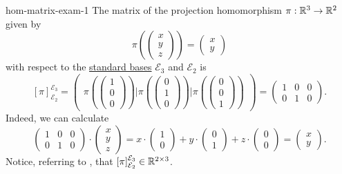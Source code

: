 \begin{example}{}{hom-matrix-exam-1}
 The matrix of the projection homomorphism $\pi:\mathbb{R}^3 \to \mathbb{R}^2$ given by
 \[
  \pi \left( 
  \begin{pmatrix}
   x\\
   y\\
   z
  \end{pmatrix}
  \right) = 
  \begin{pmatrix}
   x\\y
  \end{pmatrix}
 \]
 with respect to the \hyperref[def:standard-basis]{standard bases}
 $\mathcal{E}_3$ and $\mathcal{E}_2$ is
 \[
  [\pi]_{\mathcal{E}_2}^{\mathcal{E}_3} = 
  \begin{pmatrix}
   \pi \left( 
   \begin{pmatrix}
    1\\0\\0
   \end{pmatrix}
   \right) \mathrel{\Bigg|} \pi \left(
   \begin{pmatrix}
    0\\1\\0
   \end{pmatrix}
   \right) \mathrel{\Bigg|} \pi \left( 
   \begin{pmatrix}
    0\\0\\1
   \end{pmatrix}
   \right)
  \end{pmatrix} = 
  \begin{pmatrix}
   1 & 0 & 0\\
   0 & 1 & 0
  \end{pmatrix}.
 \]
 Indeed, we can calculate
 \[
  \begin{pmatrix}
   1 & 0 & 0\\
   0 & 1 & 0
  \end{pmatrix}
  \cdot 
  \begin{pmatrix}
   x\\y\\z
  \end{pmatrix}
  = x \cdot 
  \begin{pmatrix}
   1\\0
  \end{pmatrix}
  + y \cdot 
  \begin{pmatrix}
   0\\1
  \end{pmatrix}
  + z \cdot 
  \begin{pmatrix}
   0\\0
  \end{pmatrix}
  = 
  \begin{pmatrix}
   x\\y
  \end{pmatrix}.
 \]
 Notice, referring to , that
 $[\pi]_{\mathcal{E}_2}^{\mathcal{E}_3} \in \mathbb{R}^{2 \times 3}$.
\end{example}

